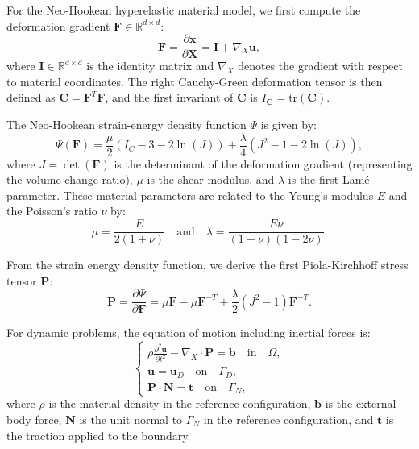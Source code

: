 For the Neo-Hookean hyperelastic material model, we first compute the deformation gradient $\bm{F} \in \mathbb{R}^{d\times d}$:
\begin{equation}
    \bm{F} = \frac{\partial \bm{x}}{\partial \bm{X}} = \bm{I} + \nabla_X \bm{u},
\label{eq:deformation_gradient}
\end{equation}
where $\bm{I} \in \mathbb{R}^{d\times d}$ is the identity matrix and $\nabla_X$ denotes the gradient with respect to material coordinates. The right Cauchy-Green deformation tensor is then defined as $\bm{C} = \bm{F}^T\bm{F}$, and the first invariant of $\bm{C}$ is $I_{\bm{C}} = \text{tr}(\bm{C})$.

The Neo-Hookean strain-energy density function $\Psi$ is given by:
\begin{equation}
    \Psi(\bm{F}) = \frac{\mu}{2} (I_C - 3 - 2\ln(J)) + \frac{\lambda}{4} (J^2 - 1 - 2\ln(J)),
\label{eq:neo_hookean_energy}
\end{equation}
where $J = \det(\bm{F})$ is the determinant of the deformation gradient (representing the volume change ratio), $\mu$ is the shear modulus, and $\lambda$ is the first Lamé parameter. These material parameters are related to the Young's modulus $E$ and the Poisson's ratio $\nu$ by:
\begin{equation}
    \mu = \frac{E}{2(1+\nu)} \quad \text{and} \quad \lambda = \frac{E\nu}{(1+\nu)(1-2\nu)}.
\end{equation}

From the strain energy density function, we derive the first Piola-Kirchhoff stress tensor $\bm{P}$:
\begin{equation}
    \bm{P} = \frac{\partial \Psi}{\partial \bm{F}} = \mu \bm{F} - \mu \bm{F}^{-T} + \frac{\lambda}{2}(J^2-1)\bm{F}^{-T}.
\label{eq:piola_stress}
\end{equation}

For dynamic problems, the equation of motion including inertial forces is:
\begin{equation}
    \begin{cases}
        \rho \frac{\partial^2 \bm{u}}{\partial t^2} - \nabla_X \cdot \bm{P} = \bm{b} \quad \text{in} \quad \Omega, \\
        \bm{u} = \bm{u}_D \quad \text{on} \quad \Gamma_D, \\
        \bm{P} \cdot \bm{N} = \bm{t} \quad \text{on} \quad \Gamma_N,
    \end{cases}
\label{eq:dynamic_problem}
\end{equation}
where $\rho$ is the material density in the reference configuration, $\bm{b}$ is the external body force, $\bm{N}$ is the unit normal to $\Gamma_N$ in the reference configuration, and $\bm{t}$ is the traction applied to the boundary.

